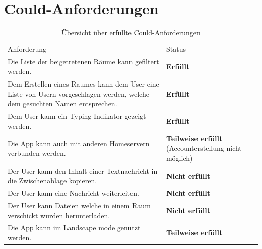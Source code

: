     \section{Could-Anforderungen}\label{sec:could-anforderungen}
    \begin{table}[h]
        \centering
        \begin{tabular}{p{}|p{}}
            Anforderung & Status\\
            \cline{1-2}
            Die Liste der beigetretenen Räume kann gefiltert werden. &  \textbf{Erfüllt} \\
            \cline{1-2}
            Dem Erstellen eines Raumes kann dem User eine Liste von Usern vorgeschlagen werden, welche dem gesuchten Namen entsprechen. & \textbf{Erfüllt}  \\
            \cline{1-2}
            Dem User kann ein Typing-Indikator gezeigt werden. &  \textbf{Erfüllt} \\
            \cline{1-2}
            Die App kann auch mit anderen Homeservern verbunden werden. & \textbf{Teilweise erfüllt} (Accounterstellung nicht möglich)\\
            \cline{1-2}
            Der User kann den Inhalt einer Textnachricht in die Zwischenablage kopieren. & \textbf{Nicht erfüllt} \\
            \cline{1-2}
            Der User kann eine Nachricht weiterleiten. & \textbf{Nicht erfüllt}  \\
            \cline{1-2}
            Der User kann Dateien welche in einem Raum verschickt wurden herunterladen. & \textbf{Nicht erfüllt}  \\
            \cline{1-2}
            Die App kann im Landscape mode genutzt werden. & \textbf{Teilweise erfüllt}
        \end{tabular}
        \caption{Übersicht über erfüllte Could-Anforderungen}
        \label{tab:erfüllte-could-anforderungen}
    \end{table}


